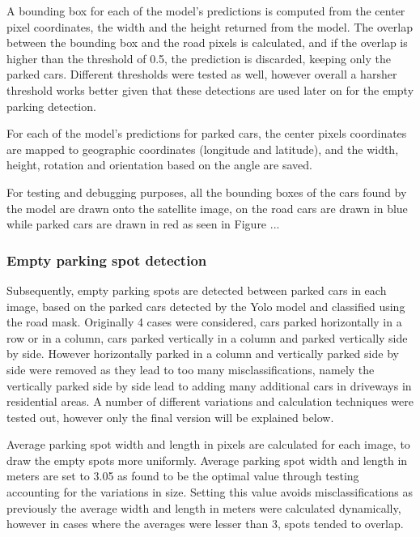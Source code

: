 A bounding box for each of the model's predictions is computed from the center pixel coordinates, the width and the height returned from the model.
The overlap between the bounding box and the road pixels is calculated, and if the overlap is higher than the threshold of 0.5, the prediction is discarded, keeping only the parked cars.
Different thresholds were tested as well, however overall a harsher threshold works better given that these detections are used later on for the empty parking detection.

For each of the model's predictions for parked cars, the center pixels coordinates are mapped to geographic coordinates (longitude and latitude), and the width, height, rotation and orientation based on the angle are saved.

For testing and debugging purposes, all the bounding boxes of the cars found by the model are drawn onto the satellite image, on the road cars are drawn in blue while parked cars are drawn in red as seen in Figure ...

\subsubsection{Empty parking spot detection}
Subsequently, empty parking spots are detected between parked cars in each image, based on the parked cars detected by the Yolo model and classified using the road mask.
Originally 4 cases were considered, cars parked horizontally in a row or in a column, cars parked vertically in a column and parked vertically side by side. However horizontally parked in a column and vertically parked side by side were removed as they lead to too many misclassifications, namely the vertically parked side by side lead to adding many additional cars in driveways in residential areas.
A number of different variations and calculation techniques were tested out, however only the final version will be explained below.

Average parking spot width and length in pixels are calculated for each image, to draw the empty spots more uniformly. Average parking spot width and length in meters are set to 3.05 as found to be the optimal value through testing accounting for the variations in size.
Setting this value avoids misclassifications as previously the average width and length in meters were calculated dynamically, however in cases where the averages were lesser than 3, spots tended to overlap.

